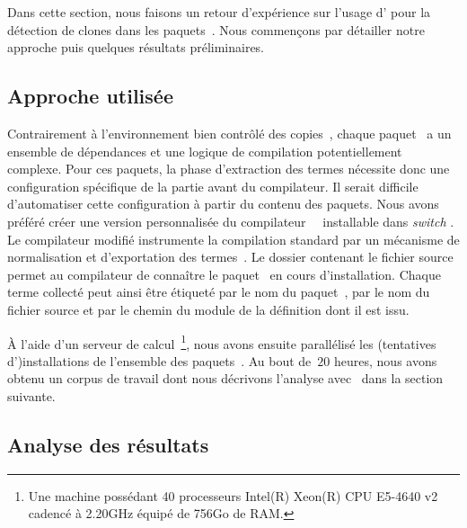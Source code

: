 
Dans cette section, nous faisons un retour d'expérience sur l'usage
d'{\Asak} pour la détection de clones dans les paquets~\Opam. Nous
commençons par détailler notre approche puis quelques résultats
préliminaires.


\subsection{Approche utilisée}

Contrairement à l'environnement bien contrôlé des
copies~{\LearnOCaml}, chaque paquet~{\Opam} a un ensemble de
dépendances et une logique de compilation potentiellement complexe.
Pour ces paquets, la phase d'extraction des termes {\LambdaCode}
nécessite donc une configuration spécifique de la partie avant du
compilateur. Il serait difficile d'automatiser cette configuration à
partir du contenu des paquets. Nous avons préféré créer une version
personnalisée du compilateur~{\OCaml}~\cite{custom-ocaml} installable
dans \textit{switch} {\Opam}.
%
Le compilateur modifié instrumente la compilation standard par un
mécanisme de normalisation et d'exportation des termes~{\LambdaCode}.
Le dossier contenant le fichier source permet au compilateur de connaître le
paquet~{\Opam} en cours d'installation. Chaque terme collecté peut
ainsi être étiqueté par le nom du paquet~\Opam, par le nom du fichier
source et par le chemin du module de la définition dont il est issu.

À l'aide d'un serveur de calcul~\footnote{Une machine possédant 40
processeurs Intel(R) Xeon(R) CPU E5-4640 v2 cadencé à 2.20GHz équipé
de 756Go de RAM.}, nous avons ensuite parallélisé les (tentatives
d')installations de l'ensemble des paquets~\Opam. Au bout de~$20$
heures, nous avons obtenu un corpus de travail dont nous décrivons
l'analyse avec~{\Asak} dans la section suivante.

\subsection{Analyse des résultats}


